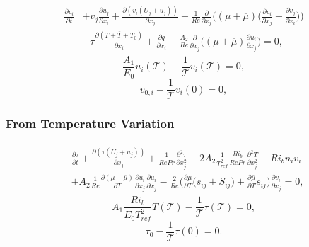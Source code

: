 \documentclass[preprint,12pt]{article}
\begin{document}
\begin{tcolorbox}
\begin{align}\begin{split}
\frac{\partial v_i}{\partial t}&+v_j\frac{\partial u_j}{\partial x_i}+\frac{\partial (v_i(U_j+u_j))}{\partial x_j}+\frac{1}{Re}\frac{\partial}{\partial x_j}\Big(({\mu}+\overline{\mu})\Big(\frac{\partial v_i}{\partial x_j}+\frac{\partial v_j}{\partial x_i}\Big)\Big)\\&-\tau\frac{\partial (T+\overline{T}+T_0)}{\partial x_i}+\frac{\partial q}{\partial x_i}-\frac{A_2}{Re}\frac{\partial}{\partial x_j}\Big((\mu+\overline{\mu})\frac{\partial u_i}{\partial x_j}\Big)=0,
\end{split}
\end{align}
\begin{equation}\label{eq:Adjoint_Direct_final_velocity}
\frac{A_1}{E_0}u_i(\mathcal{T})-\frac{1}{\mathcal{T}}v_i(\mathcal{T})=0,
\end{equation}
\begin{equation}\label{eq:Adjoint_Direct_initial_velocity_1}
v_{0,i}-\frac{1}{\mathcal{T}}v_i(0)=0,
\end{equation}
\subsubsection*{From Temperature Variation}
\begin{align}\label{eq:Adjoint_scalar}\begin{split}
&\frac{\partial \tau}{\partial t}+\frac{\partial(\tau(U_j+u_j))}{\partial x_j}+\frac{1}{RePr}\frac{\partial^2\tau}{\partial x_j^2}-2A_2\frac{1}{T_{ref}^2}\frac{Ri_b}{Re Pr}\frac{\partial^2 T}{\partial x_j^2}+Ri_bn_iv_i\\&+A_2\frac{1}{Re}\frac{\partial (\mu+\overline{\mu})}{\partial T}\frac{\partial u_{i}}{\partial x_j}\frac{\partial u_{i}}{\partial x_j}-\frac{2}{Re}\Big(\frac{\partial\mu}{\partial T}\big(s_{ij}+S_{ij}\big)+\frac{\partial\bar{\mu}}{\partial T}s_{ij}\Big)\frac{\partial v_i}{\partial x_j}=0,
\end{split}
\end{align}
\begin{equation}\label{eq:Adjoint_Direct_final_temperature}
A_1\frac{Ri_b}{E_0T_{ref}^2} T(\mathcal{T})-\frac{1}{\mathcal{T}}\tau(\mathcal{T})=0,
\end{equation}
\begin{equation}\label{eq:Adjoint_Direct_initial_temperature_1}
\tau_0-\frac{1}{\mathcal{T}}\tau(0)=0.
\end{equation}

\end{tcolorbox}
\end{document}
